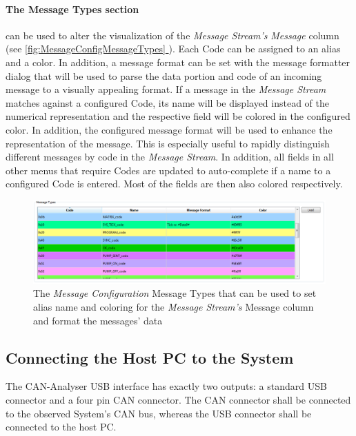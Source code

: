 \documentclass[12pt,a4paper]{scrartcl}
\newcommand*{\fullref}[1]{\hyperref[{#1}]{\autoref*{#1} \nameref*{#1}}} %
\begin{document}
\FloatBarrier
\paragraph{The Message Types section} can be used to alter the visualization of the \textit{Message Stream's} \textit{Message} column (see \fullref{fig:MessageConfigMessageTypes}). Each Code can be assigned to an alias and a color. In addition, a message format can be set with the message formatter dialog that will be used to parse the data portion and code of an incoming message to a visually appealing format. If a message in the \textit{Message Stream} matches against a configured Code, its name will be displayed instead of the numerical representation and the respective field will be colored in the configured color. In addition, the configured message format will be used to enhance the representation of the message. This is especially useful to rapidly distinguish different messages by code in the \textit{Message Stream}. In addition, all fields in all other menus that require Codes are updated to auto-complete if a name to a configured Code is entered. Most of the fields are then also colored respectively.

\begin{figure}
	\centering
	\includegraphics[width=\linewidth,keepaspectratio]{Graphics/MessageConfigMessageTypes}
	\caption[Message Configuration Message Types]{The \textit{Message Configuration} Message Types that can be used to set alias name and coloring for the \textit{Message Stream's} Message column and format the messages' data}
	\label{fig:MessageConfigMessageTypes}
\end{figure}

\FloatBarrier


\FloatBarrier
\subsection{Connecting the Host PC to the System}
\label{subsec:GettingStartedEstablishConnection}
The CAN-Analyser USB interface has exactly two outputs: a standard USB connector and a four pin CAN connector. The CAN connector shall be connected to the observed System's CAN bus, whereas the USB connector shall be connected to the host PC.
\end{document}
